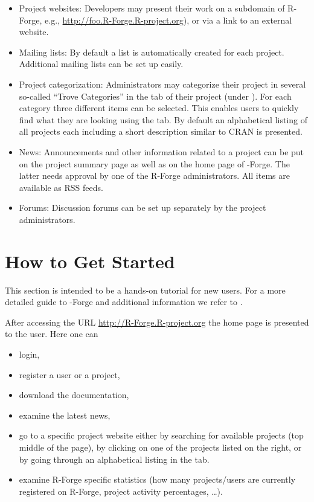 \begin{itemize}
\item Project websites: Developers may present their work
  on a subdomain of R-Forge, e.g.,
  \url{http://foo.R-Forge.R-project.org}), or via a link to an
  external website.
\item Mailing lists: By default a list
   is automatically
  created for each project. Additional mailing lists can be
  set up easily.
\item Project categorization: Administrators may categorize their
  project in several so-called ``Trove Categories'' in the 
  tab of their project (under ). For each
  category three different items can be selected. This enables users
  to quickly find what they are looking using the 
  tab. By default an alphabetical listing of all projects each
  including a short description similar to CRAN is presented.
\item News: Announcements and other information related to a project
  can be put on the project summary page as well as on the 
  home page of \R{}-Forge. The latter needs approval by one of the R-Forge
  administrators. All items are available as RSS feeds.
\item Forums: Discussion forums can be set up separately by the
  project administrators.%
\end{itemize}

\section{How to Get Started}
This section is intended to be a hands-on tutorial for new users. For
a more detailed guide to \R{}-Forge and additional 
information we refer to \citet[][subsequently
referred to as user's manual]{forge:usermanual:2008}.

After accessing the URL \url{http://R-Forge.R-project.org} the home
page is presented to the user. Here one can
\begin{itemize}
\item login,
\item register a user or a project,
\item download the documentation,
\item examine the latest news,
\item go to a specific project website either by searching for available
  projects (top middle of the page), by clicking on one of the projects
  listed on the right, or by going through an alphabetical listing in
  the  tab. 
\item examine R-Forge specific statistics (how many projects/users
  are currently registered on R-Forge, project activity percentages,
  \ldots{}).
\end{itemize}

